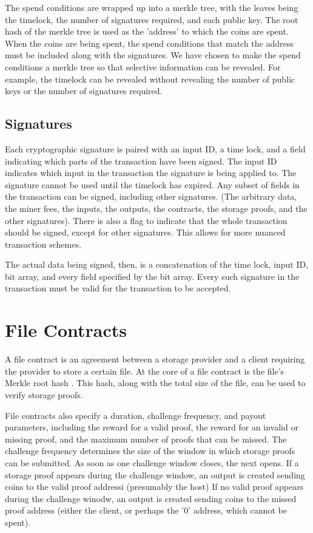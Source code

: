 \documentclass[twocolumn]{article}
\begin{document}
The spend conditions are wrapped up into a merkle tree, with the leaves being the timelock, the number of signatures required, and each public key.
The root hash of the merkle tree is used as the 'address' to which the coins are spent.
When the coins are being spent, the spend conditions that match the address must be included along with the signatures.
We have chosen to make the spend conditions a merkle tree so that selective information can be revealed.
For example, the timelock can be revealed without revealing the number of public keys or the number of signatures required.

\subsection{Signatures}
Each cryptographic signature is paired with an input ID, a time lock, and a field indicating which parts of the transaction have been signed.
The input ID indicates which input in the transaction the signature is being applied to.
The signature cannot be used until the timelock has expired.
Any subset of fields in the transaction can be signed, including other signatures. (The arbitrary data, the miner fees, the inputs, the outputs, the contracts, the storage proofs, and the other signatures).
There is also a flag to indicate that the whole transaction should be signed, except for other signatures.
This allows for more nuanced transaction schemes.

The actual data being signed, then, is a concatenation of the time lock, input ID, bit array, and every field specified by the bit array.
Every such signature in the transaction must be valid for the transaction to be accepted.

\section{File Contracts}
\label{sec:contracts}
A file contract is an agreement between a storage provider and a client requiring the provider to store a certain file.
At the core of a file contract is the file's Merkle root hash \cite{merkle}.
This hash, along with the total size of the file, can be used to verify storage proofs.

File contracts also specify a duration, challenge frequency, and payout parameters, including the reward for a valid proof, the reward for an invalid or missing proof, and the maximum number of proofs that can be missed.
The challenge frequency determines the size of the window in which storage proofs can be submitted.
As soon as one challenge window closes, the next opens.
If a storage proof appears during the challenge window, an output is created sending coins to the valid proof addressi (presumably the host)
If no valid proof appears during the challenge winodw, an output is created sending coins to the missed proof address (either the client, or perhaps the '0' address, which cannot be spent).
\end{document}

